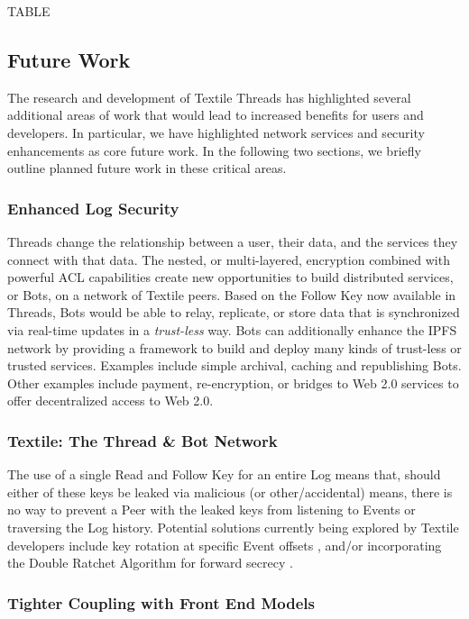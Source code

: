 \documentclass{textile}
\begin{document}
TABLE

\subsection{Future Work}

The research and development of Textile Threads has highlighted several additional areas of work that would lead to increased benefits for users and developers. In particular, we have highlighted network services and security enhancements as core future work. In the following two sections, we briefly outline planned future work in these critical areas.

\subsubsection{Enhanced Log Security}

Threads change the relationship between a user, their data, and the services they connect with that data. The nested, or multi-layered, encryption combined with powerful ACL capabilities create new opportunities to build distributed services, or Bots, on a network of Textile peers. Based on the Follow Key now available in Threads, Bots would be able to relay, replicate, or store data that is synchronized via real-time updates in a \emph{trust-less} way. Bots can additionally enhance the IPFS network by providing a framework to build and deploy many kinds of trust-less or trusted services. Examples include simple archival, caching and republishing Bots. Other examples include payment, re-encryption, or bridges to Web 2.0 services to offer decentralized access to Web 2.0.

\subsubsection{Textile: The Thread \& Bot Network} \label{sec:Bots}

The use of a single Read and Follow Key for an entire Log means that, should either of these keys be leaked via malicious (or other/accidental) means, there is no way to prevent a Peer with the leaked keys from listening to Events or traversing the Log history. Potential solutions currently being explored by Textile developers include key rotation at specific Event offsets \cite{hashicorpKeyRotation}, and/or incorporating the Double Ratchet Algorithm \cite{marlinspikeDoubleRatchetAlgorithm2016} for forward secrecy \cite{ungerSoKSecureMessaging2015}.

\subsubsection{Tighter Coupling with Front End Models}\label{sec:coupling}
\end{document}
